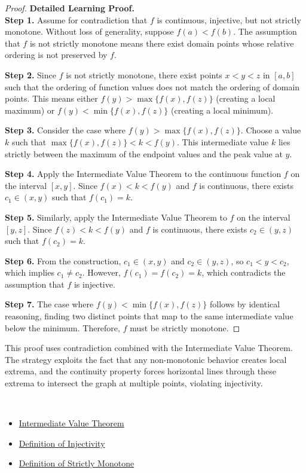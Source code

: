 \begin{proof}
\textbf{Detailed Learning Proof.}~\\

\textbf{Step 1.} Assume for contradiction that $f$ is continuous, injective, but not strictly monotone. Without loss of generality, suppose $f(a) < f(b)$. The assumption that $f$ is not strictly monotone means there exist domain points whose relative ordering is not preserved by $f$.

\textbf{Step 2.} Since $f$ is not strictly monotone, there exist points $x < y < z$ in $[a,b]$ such that the ordering of function values does not match the ordering of domain points. This means either $f(y) > \max\{f(x), f(z)\}$ (creating a local maximum) or $f(y) < \min\{f(x), f(z)\}$ (creating a local minimum).

\textbf{Step 3.} Consider the case where $f(y) > \max\{f(x), f(z)\}$. Choose a value $k$ such that $\max\{f(x), f(z)\} < k < f(y)$. This intermediate value $k$ lies strictly between the maximum of the endpoint values and the peak value at $y$.

\textbf{Step 4.} Apply the Intermediate Value Theorem to the continuous function $f$ on the interval $[x, y]$. Since $f(x) < k < f(y)$ and $f$ is continuous, there exists $c_1 \in (x, y)$ such that $f(c_1) = k$.

\textbf{Step 5.} Similarly, apply the Intermediate Value Theorem to $f$ on the interval $[y, z]$. Since $f(z) < k < f(y)$ and $f$ is continuous, there exists $c_2 \in (y, z)$ such that $f(c_2) = k$.

\textbf{Step 6.} From the construction, $c_1 \in (x, y)$ and $c_2 \in (y, z)$, so $c_1 < y < c_2$, which implies $c_1 \neq c_2$. However, $f(c_1) = f(c_2) = k$, which contradicts the assumption that $f$ is injective.

\textbf{Step 7.} The case where $f(y) < \min\{f(x), f(z)\}$ follows by identical reasoning, finding two distinct points that map to the same intermediate value below the minimum. Therefore, $f$ must be strictly monotone.
\end{proof}

\begin{remark*}
This proof uses contradiction combined with the Intermediate Value Theorem. The strategy exploits the fact that any non-monotonic behavior creates local extrema, and the continuity property forces horizontal lines through these extrema to intersect the graph at multiple points, violating injectivity.
\end{remark*}

\begin{remark*}[Dependencies]~\\
\begin{itemize}
  \item \hyperref[thm:ivt]{Intermediate Value Theorem}
  \item \hyperref[def:injectivity]{Definition of Injectivity}
  \item \hyperref[def:strict-monotone]{Definition of Strictly Monotone}
\end{itemize}
\end{remark*}
